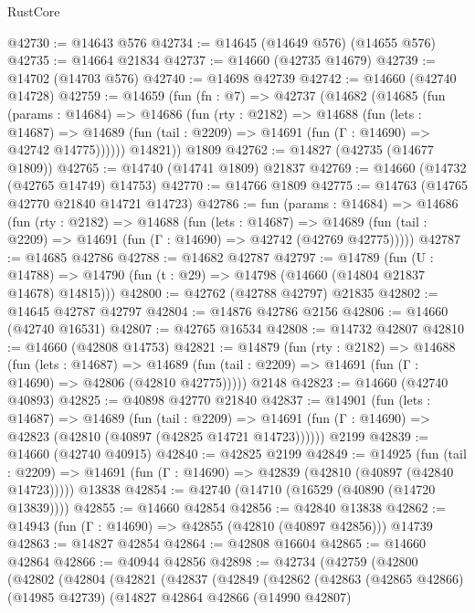 \begin{lexlean}{RustCore}
\begin{coremodule}
@42730 := @14643 @576
@42734 := @14645 (@14649 @576) (@14655 @576)
@42735 := @14664 @21834
@42737 := @14660 (@42735 @14679)
@42739 := @14702 (@14703 @576)
@42740 := @14698 @42739
@42742 := @14660 (@42740 @14728)
@42759 := @14659
    (fun (fn : @7) =>
    @42737
      (@14682
        (@14685
          (fun (params : @14684) =>
          @14686
            (fun (rty : @2182) =>
            @14688
              (fun (lets : @14687) =>
              @14689 (fun (tail : @2209) => @14691 (fun (Γ : @14690) => @42742 @14775))))))
        @14821))
    @1809
@42762 := @14827 (@42735 (@14677 @1809))
@42765 := @14740 (@14741 @1809) @21837
@42769 := @14660 (@14732 (@42765 @14749) @14753)
@42770 := @14766 @1809
@42775 := @14763 (@14765 @42770 @21840 @14721 @14723)
@42786 := fun (params : @14684) =>
  @14686
    (fun (rty : @2182) =>
    @14688
      (fun (lets : @14687) =>
      @14689 (fun (tail : @2209) => @14691 (fun (Γ : @14690) => @42742 (@42769 @42775)))))
@42787 := @14685 @42786
@42788 := @14682 @42787
@42797 := @14789
    (fun (U : @14788) => @14790 (fun (t : @29) => @14798 (@14660 (@14804 @21837 @14678) @14815)))
@42800 := @42762 (@42788 @42797) @21835
@42802 := @14645 @42787 @42797
@42804 := @14876 @42786 @2156
@42806 := @14660 (@42740 @16531)
@42807 := @42765 @16534
@42808 := @14732 @42807
@42810 := @14660 (@42808 @14753)
@42821 := @14879
    (fun (rty : @2182) =>
    @14688
      (fun (lets : @14687) =>
      @14689 (fun (tail : @2209) => @14691 (fun (Γ : @14690) => @42806 (@42810 @42775)))))
    @2148
@42823 := @14660 (@42740 @40893)
@42825 := @40898 @42770 @21840
@42837 := @14901
    (fun (lets : @14687) =>
    @14689
      (fun (tail : @2209) =>
      @14691 (fun (Γ : @14690) => @42823 (@42810 (@40897 (@42825 @14721 @14723))))))
    @2199
@42839 := @14660 (@42740 @40915)
@42840 := @42825 @2199
@42849 := @14925
    (fun (tail : @2209) => @14691 (fun (Γ : @14690) => @42839 (@42810 (@40897 (@42840 @14723)))))
    @13838
@42854 := @42740 (@14710 (@16529 (@40890 (@14720 @13839))))
@42855 := @14660 @42854
@42856 := @42840 @13838
@42862 := @14943 (fun (Γ : @14690) => @42855 (@42810 (@40897 @42856))) @14739
@42863 := @14827 @42854
@42864 := @42808 @16604
@42865 := @14660 @42864
@42866 := @40944 @42856
@42898 := @42734
    (@42759
      (@42800
        (@42802
          (@42804
            (@42821
              (@42837
                (@42849
                  (@42862
                    (@42863
                      (@42865 @42866)
                      (@14985 @42739)
                      (@14827
                        @42864
                        @42866
                        (@14990 @42807)

\end{coremodule}
\end{lexlean}
